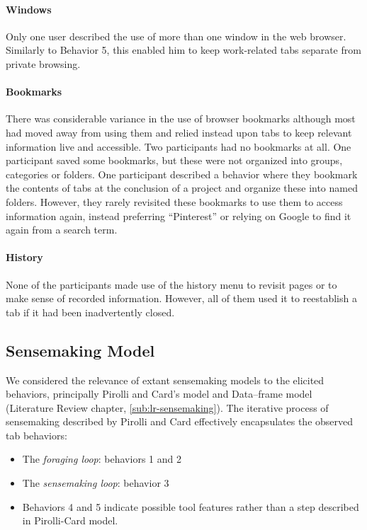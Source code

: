 \paragraph{Windows}
Only one user described the use of more than one window in the web browser. Similarly to Behavior 5, this enabled him to keep work-related tabs separate from private browsing.

\paragraph{Bookmarks}
There was considerable variance in the use of browser bookmarks although most had moved away from using them and relied instead upon tabs to keep relevant information live and accessible. Two participants had no bookmarks at all.  One participant saved some bookmarks, but these were not organized into groups, categories or folders. One participant described a behavior where they bookmark the contents of tabs at the conclusion of a project and organize these into named folders. However, they rarely revisited these bookmarks to use them to access information again, instead preferring ``Pinterest'' or relying on Google to find it again from a search term.

\paragraph{History}
None of the participants made use of the history menu to revisit pages or to make sense of recorded information. However, all of them used it to reestablish a tab if it had been inadvertently closed.

\subsection{Sensemaking Model}
We considered the relevance of extant sensemaking models to the elicited behaviors, principally Pirolli and Card's model and Data--frame model (Literature Review chapter, \autoref{sub:lr-sensemaking}). The iterative process of sensemaking described by Pirolli and Card effectively encapsulates the observed tab behaviors:

\begin{itemize}
	\item The \emph{foraging loop}: behaviors 1 and 2
	\item The \emph{sensemaking loop}: behavior 3
	\item Behaviors 4 and 5 indicate possible tool features rather than a step described in Pirolli-Card model.
\end{itemize}

